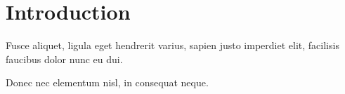 \section*{Introduction}

Fusce aliquet, ligula eget hendrerit varius, sapien justo imperdiet elit, facilisis
faucibus dolor nunc eu dui.

Donec nec elementum nisl, in consequat neque.

